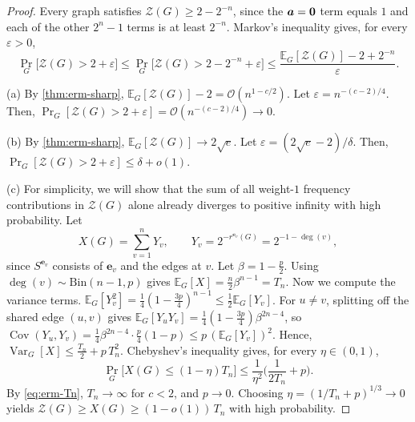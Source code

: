 \documentclass{article}
\theoremstyle{plain}
\theoremstyle{definition}
\theoremstyle{remark}
\begin{document}
\begin{proof}
Every graph satisfies $\mathcal Z(G)\ge2-2^{-n}$, since the ${\bm{a}}=\bm 0$ term equals $1$ and each of the other $2^n-1$ terms is at least $2^{-n}$. Markov's inequality gives, for every $\varepsilon>0$,
\begin{equation}\label{eq:erm-markov}
\Pr_G\big[\mathcal Z(G)>2+\varepsilon\big] \leq \Pr_G\big[\mathcal Z(G)>2-2^{-n}+\varepsilon\big] \leq \frac{\mathbb{E}_G[\mathcal Z(G)]-2+2^{-n}}{\varepsilon}.
\end{equation}

(a) By \cref{thm:erm-sharp}, $\mathbb{E}_G[\mathcal Z(G)]-2 = \mathcal O(n^{1-c/2})$. Let $\varepsilon=n^{-(c-2)/4}$. Then, $\Pr_G[\mathcal Z(G)>2+\varepsilon]=\mathcal O(n^{-(c-2)/4})\to0$.

(b) By \cref{thm:erm-sharp}, $\mathbb{E}_G[\mathcal Z(G)]\to2\sqrt e$. Let $\varepsilon=(2\sqrt e-2)/\delta$. Then, $\Pr_G[\mathcal Z(G)>2+\varepsilon]\le\delta+o(1)$.

(c) For simplicity, we will show that the sum of all weight-$1$ frequency contributions in $\mathcal Z(G)$ alone already diverges to positive infinity with high probability. Let \begin{equation}
X(G)=\sum\limits_{v=1}^{n}Y_v, \qquad Y_v=2^{-r^{\bm e_v}(G)}=2^{-1-\deg(v)},
\end{equation} since $S^{\bm e_v}$ consists of $\bm e_v$ and the edges at $v$. Let $\beta=1-\frac p2$. Using $\deg(v)\sim\mathrm{Bin}(n-1,p)$ gives $\mathbb{E}_G[X]=\frac n2\beta^{n-1}=T_n$. Now we compute the variance terms. $\mathbb{E}_G[Y_v^2]=\frac14(1-\frac{3p}4)^{n-1}\le\frac12\mathbb{E}_G[Y_v]$. For $u\ne v$, splitting off the shared edge $(u,v)$ gives $\mathbb{E}_G[Y_uY_v]=\frac14(1-\frac{3p}4)\beta^{2n-4}$, so $\operatorname{Cov}(Y_u,Y_v)=\frac14\beta^{2n-4}\cdot\frac p4(1-p)\le p\,(\mathbb{E}_G[Y_v])^2$. Hence, $\operatorname{Var}_G[X]\le\frac{T_n}2+p\,T_n^2$. Chebyshev's inequality gives, for every $\eta\in(0,1)$,
\begin{equation}
\Pr_G\big[X(G)\le(1-\eta)T_n\big]\le\frac1{\eta^2}\Big(\frac1{2T_n}+p\Big).
\end{equation}
By \eqref{eq:erm-Tn}, $T_n\to\infty$ for $c<2$, and $p\to0$. Choosing $\eta=(1/T_n+p)^{1/3}\to0$ yields $\mathcal Z(G)\ge X(G)\ge(1-o(1))\,T_n$ with high probability.
\end{proof}
\end{document}
